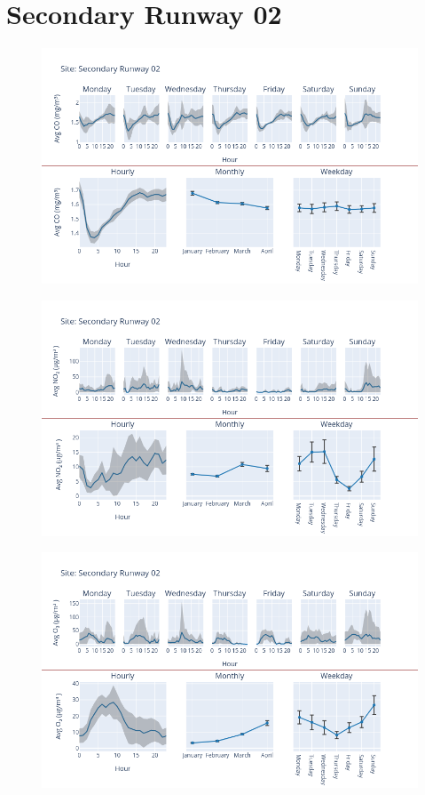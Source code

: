 \documentclass[12pt, oneside]{book}
\begin{document}
{\section{Secondary Runway 02}
{\begin{figure}[H] 
 \centering 
\includegraphics[width=.88\textwidth, keepaspectratio]{image170} 
 \end{figure}}{} 

{\begin{figure}[H] 
 \centering 
\includegraphics[width=.88\textwidth, keepaspectratio]{image171} 
 \end{figure}}{} 

{\begin{figure}[H] 
 \centering 
\includegraphics[width=.88\textwidth, keepaspectratio]{image172} 
 \end{figure}}{} 

}
\end{document}
